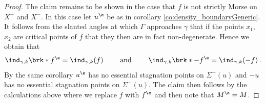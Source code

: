 \begin{proof}
  

  The claim remains to be shown in the case that $f$ is not strictly Morse on $X^+$ and $X^-$. In this case let
  $u^\e$ be as in corollary \ref{co:density_boundaryGeneric}.
  It follows from the slanted angles at which $\Gamma$ approaches $\gamma$ that if the points $x_1$, $x_2$ are critical points of $f$
  that they then are in fact non-degenerate.
  Hence we obtain that
  \begin{align}
    \ind_{\gamma,k}\brk*{f^\e}=\ind_{\gamma,k}(f)\qquad\text{ and }\qquad 
    \ind_{\gamma,k}\brk*{-f^\e}=\ind_{\gamma,k}(-f)\,.
    \label{eq:n3_disproof_morse_indexApprox}
  \end{align}
  By the same corollary $u^\e$ has no essential stagnation points on $\Sigma^+(u)$
  and $-u$ has no essential stagnation points on $\Sigma^-(u)$.
  The claim then follows by the calculations above where we replace
  $f$ with $f^\e$ and then note that $M^\e=M$.
\end{proof}


